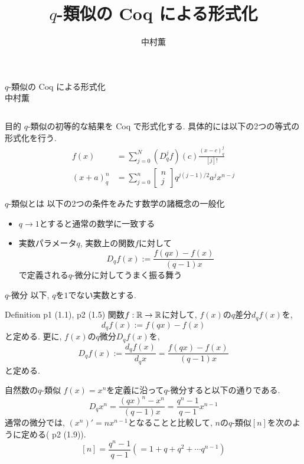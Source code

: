 \documentclass[unicode,mathserif]{beamer}
\title{$q$-類似の Coq による形式化}
\author{中村薫}
\newcommand{\qcoe}[2]{\left[\begin{array}{ccc}#1\\#2\end{array}\right]}
\begin{document}
\begin{frame}[fragile]
  \begin{screen}
    \begin{center}
      {\Huge $q$-類似の Coq による形式化} \\
      {\Large 中村薫} 
    \end{center}
  \end{screen}

	\begin{columns}[T]
		\begin{column}{0.33\columnwidth}
			\begin{block}{目的}
				$q$-類似の初等的な結果を Coq で形式化する.
				具体的には以下の2つの等式の形式化を行う. 
				\begin{align*}
					f(x) &= \sum_{j=0}^N (D_q^jf)(c)\frac{(x-c)^j_q}{[j]!} \\
					(x + a)^n_q &= \sum_{j = 0}^n \qcoe{n}{j} q^{j (j - 1)/2} a^j x^{n - j}
				\end{align*}
			\end{block}
			
		\begin{block}{$q$-類似とは}
			以下の2つの条件をみたす数学の諸概念の一般化
			\begin{itemize}
				\item $q \to 1$とすると通常の数学に一致する
	          \item 実数パラメータ$q$, 実数上の関数$f$に対して
					\[
						D_q f(x) := \frac{f(qx) - f(x)}{(q - 1) x}
					\]
					で定義される$q$-微分に対してうまく振る舞う
			\end{itemize}
		\end{block}

		\begin{block}{$q$-微分}
			以下, $q$を$1$でない実数とする.
			\begin{itembox}{Definition \cite{Kac} p1 (1.1), p2 (1.5)}
				関数$f : \mathbb R \to \mathbb R$に対して, $f(x)$の$q$差分$d_q f(x)$を, 
				\[
					d_q f(x) := f (qx) - f(x)
				\]
				と定める. 更に, $f(x)$の$q$微分$D_q f(x)$を, 
	 			\[
					D_q f(x) := \frac{d_q f(x)}{d_q x} = \frac{f(qx) - f(x)}{(q - 1) x}
				\]
				と定める. 
			\end{itembox}
		\end{block}
   
		\begin{block}{自然数の$q$-類似}
			$f(x) = x^n$を定義に沿って$q$-微分すると以下の通りである. 
			\[
				D_q x^n = \frac{(qx)^n - x^n}{(q - 1) x}
							= \frac{q^n - 1}{q - 1} x^{n - 1}
			\]
			通常の微分では, $(x^n)' = n x^{n - 1}$となることと比較して, 
			$n$の$q$-類似$[n]$を次のように定める(\cite{Kac} p2 (1.9)).
			\[
				[n] = \frac{q^n - 1}{q - 1} (= 1 + q + q^2 + \cdots q^{n - 1})
			\]
		\end{block}


\end{column}
\end{columns}
\end{frame}
\end{document}
